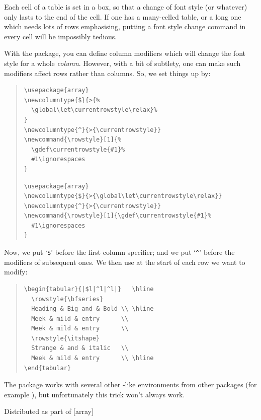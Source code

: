 
Each cell of a table is set in a box, so that a change of font style
(or whatever) only lasts to the end of the cell.  If one has a
many-celled table, or a long one which needs lots of rows emphasising,
putting a font style change command in every cell will be impossibly
tedious.

With the  package, you can define column modifiers
which will change the font style for a whole \emph{column}.  However,
with a bit of subtlety, one can make such modifiers affect rows rather
than columns.  So, we set things up by:
\begin{quote}
\begin{narrowversion}
\begin{verbatim}
\usepackage{array}
\newcolumntype{$}{>{%
  \global\let\currentrowstyle\relax}%
}
\newcolumntype{^}{>{\currentrowstyle}}
\newcommand{\rowstyle}[1]{%
  \gdef\currentrowstyle{#1}%
  #1\ignorespaces
}
\end{verbatim}
\end{narrowversion}
\begin{wideversion}
\begin{verbatim}
\usepackage{array}
\newcolumntype{$}{>{\global\let\currentrowstyle\relax}}
\newcolumntype{^}{>{\currentrowstyle}}
\newcommand{\rowstyle}[1]{\gdef\currentrowstyle{#1}%
  #1\ignorespaces
}
\end{verbatim}
\end{wideversion}
\end{quote}
Now, we put `\texttt{\$}' before the first column specifier; and we
put `\texttt{\textasciicircum }'
before the modifiers of subsequent ones.  We then use  at
the start of each row we want to modify:
\begin{quote}
\begin{verbatim}
\begin{tabular}{|$l|^l|^l|}   \hline
  \rowstyle{\bfseries}
  Heading & Big and & Bold \\ \hline
  Meek & mild & entry      \\
  Meek & mild & entry      \\
  \rowstyle{\itshape}
  Strange & and & italic   \\
  Meek & mild & entry      \\ \hline
\end{tabular}
\end{verbatim}
\end{quote}
The  package works with several other
-like environments from other packages (for
example ), but unfortunately this trick won't
always work.
\begin{ctanrefs}
\item[array.sty]Distributed as part of [array]
\end{ctanrefs}


